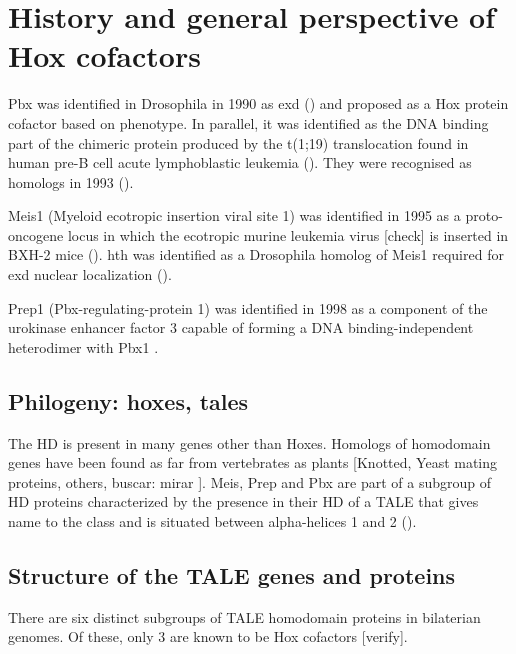 
\section{History and general perspective of Hox cofactors}

Pbx was identified in Drosophila in 1990 as \ac{exd} (\cite{Peifer1990}) and proposed as a Hox protein cofactor based on phenotype. In parallel, it was identified as the DNA binding part of the chimeric protein produced by the t(1;19) translocation found in human pre-B cell acute lymphoblastic leukemia (\cite{Kamps1990}). They were recognised as homologs in 1993 (\cite{Rauskolb1993}).

Meis1 (Myeloid ecotropic insertion viral site 1) was identified in 1995 as a proto-oncogene locus in which the ecotropic murine leukemia virus [check] is inserted in BXH-2 mice (\cite{Moskow1995}). \ac{hth} was identified as a Drosophila homolog of Meis1 required for \ac{exd} nuclear localization (\cite{Rauskolb1995, Rieckhof1997}).

Prep1 (Pbx-regulating-protein 1) was identified in 1998 as a component of the urokinase enhancer factor 3 capable of forming a DNA binding-independent heterodimer with Pbx1 \cite{Berthelsen1998,Berthelsen1998a}.

\subsection{Philogeny: hoxes, tales}

The \ac{HD} is present in many genes other than Hoxes. Homologs of homodomain genes have been found as far from vertebrates as plants [Knotted, Yeast mating proteins, others, buscar: mirar \cite{Burglin1997}]. Meis, Prep and Pbx are part of a subgroup of \ac{HD} proteins characterized by the presence in their \ac{HD} of a \ac{TALE} that gives name to the class and is situated between alpha-helices 1 and 2 (\cite{Bertolino1995, Burglin1997, Mukherjee2007, Moens2006}). 

\subsection{Structure of the TALE genes and proteins}

There are six distinct subgroups of \ac{TALE} homodomain proteins in bilaterian genomes. Of these, only 3 are known to be Hox cofactors [verify]. 

